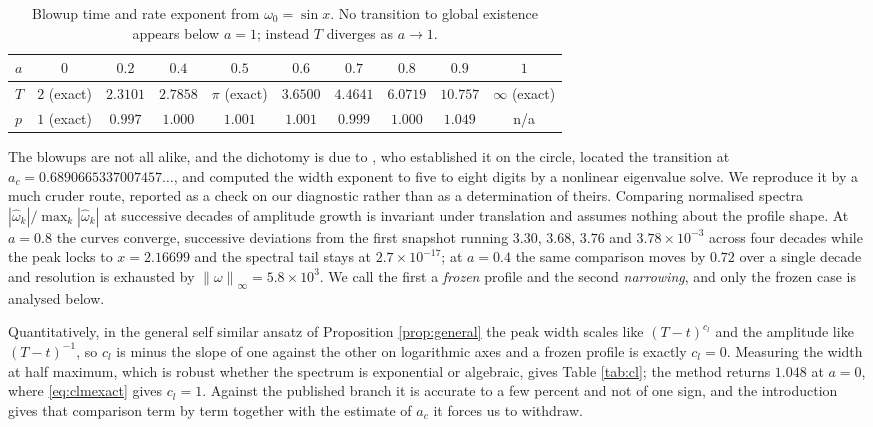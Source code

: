 \documentclass[11pt]{article}
\theoremstyle{definition}
\newcommand{\norm}[1]{\left\lVert #1 \right\rVert}
\newcommand{\abs}[1]{\left\lvert #1 \right\rvert}
\begin{document}
\begin{table}[htbp]
\centering
\begin{tabular}{lccccccccc}
\toprule
$a$   & $0$ & $0.2$ & $0.4$ & $0.5$ & $0.6$ & $0.7$ & $0.8$ & $0.9$ & $1$\\
\midrule
$T$   & $2$ (exact) & $2.3101$ & $2.7858$ & $\pi$ (exact) & $3.6500$ & $4.4641$
      & $6.0719$ & $10.757$ & $\infty$ (exact)\\
$p$   & $1$ (exact) & $0.997$ & $1.000$ & $1.001$ & $1.001$ & $0.999$
      & $1.000$ & $1.049$ & n/a\\
\bottomrule
\end{tabular}
\caption{Blowup time and rate exponent from $\omega_0=\sin x$. No transition to
global existence appears below $a=1$; instead $T$ diverges as $a\to 1$.}
\label{tab:times}
\end{table}

The blowups are not all alike, and the dichotomy is due to \cite{lss2020}, who
established it on the circle, located the transition at
$a_c = 0.6890665337007457\ldots$, and computed the width exponent to five to
eight digits by a nonlinear eigenvalue solve. We reproduce it by a much cruder
route, reported as a check on our diagnostic rather than as a determination of
theirs. Comparing normalised spectra
$\abs{\hat\omega_k}/\max_k\abs{\hat\omega_k}$ at successive decades of amplitude
growth is invariant under translation and assumes nothing about the profile
shape. At $a=0.8$ the curves converge, successive deviations from the first
snapshot running $3.30$, $3.68$, $3.76$ and $3.78\times10^{-3}$ across four
decades while the peak locks to $x=2.16699$ and the spectral tail stays at
$2.7\times10^{-17}$; at $a=0.4$ the same comparison moves by $0.72$ over a
single decade and resolution is exhausted by
$\norm{\omega}_\infty = 5.8\times10^3$. We call the first a \emph{frozen}
profile and the second \emph{narrowing}, and only the frozen case is analysed
below.

Quantitatively, in the general self similar ansatz of Proposition
\ref{prop:general} the peak width scales like $(T-t)^{c_l}$ and the amplitude
like $(T-t)^{-1}$, so $c_l$ is minus the slope of one against the other on
logarithmic axes and a frozen profile is exactly $c_l=0$. Measuring the width at
half maximum, which is robust whether the spectrum is exponential or algebraic,
gives Table \ref{tab:cl}; the method returns $1.048$ at $a=0$, where
\eqref{eq:clmexact} gives $c_l=1$. Against the published branch it is accurate
to a few percent and not of one sign, and the introduction gives that
comparison term by term together with the estimate of $a_c$ it forces us to
withdraw.
\end{document}
